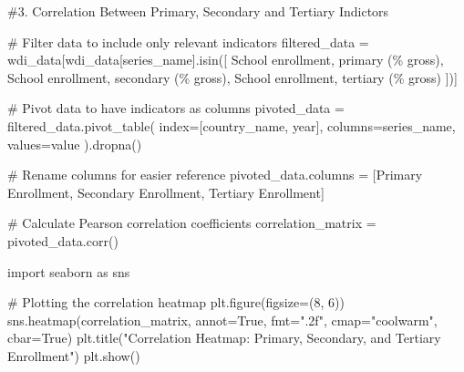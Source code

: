 \documentclass[
  letterpaper,
  DIV=11,
  numbers=noendperiod]{scrartcl}
\newenvironment{Shaded}{\begin{snugshade}}{\end{snugshade}}
\newcommand{\CommentTok}[1]{\textcolor[rgb]{0.37,0.37,0.37}{#1}}
\newcommand{\DecValTok}[1]{\textcolor[rgb]{0.68,0.00,0.00}{#1}}
\newcommand{\ImportTok}[1]{\textcolor[rgb]{0.00,0.46,0.62}{#1}}
\newcommand{\NormalTok}[1]{\textcolor[rgb]{0.00,0.23,0.31}{#1}}
\newcommand{\OperatorTok}[1]{\textcolor[rgb]{0.37,0.37,0.37}{#1}}
\newcommand{\SpecialCharTok}[1]{\textcolor[rgb]{0.37,0.37,0.37}{#1}}
\newcommand{\StringTok}[1]{\textcolor[rgb]{0.13,0.47,0.30}{#1}}
\newcommand{\VariableTok}[1]{\textcolor[rgb]{0.07,0.07,0.07}{#1}}
\begin{document}
\begin{Shaded}
\begin{Highlighting}[]
\CommentTok{\#3. Correlation Between Primary, Secondary and Tertiary Indictors}

\CommentTok{\# Filter data to include only relevant indicators}
\NormalTok{filtered\_data }\OperatorTok{=}\NormalTok{ wdi\_data[wdi\_data[}\StringTok{\textquotesingle{}series\_name\textquotesingle{}}\NormalTok{].isin([}
    \StringTok{\textquotesingle{}School enrollment, primary (}\SpecialCharTok{\% g}\StringTok{ross)\textquotesingle{}}\NormalTok{,}
    \StringTok{\textquotesingle{}School enrollment, secondary (}\SpecialCharTok{\% g}\StringTok{ross)\textquotesingle{}}\NormalTok{,}
    \StringTok{\textquotesingle{}School enrollment, tertiary (}\SpecialCharTok{\% g}\StringTok{ross)\textquotesingle{}}
\NormalTok{])]}

\CommentTok{\# Pivot data to have indicators as columns}
\NormalTok{pivoted\_data }\OperatorTok{=}\NormalTok{ filtered\_data.pivot\_table(}
\NormalTok{    index}\OperatorTok{=}\NormalTok{[}\StringTok{\textquotesingle{}country\_name\textquotesingle{}}\NormalTok{, }\StringTok{\textquotesingle{}year\textquotesingle{}}\NormalTok{], }
\NormalTok{    columns}\OperatorTok{=}\StringTok{\textquotesingle{}series\_name\textquotesingle{}}\NormalTok{, }
\NormalTok{    values}\OperatorTok{=}\StringTok{\textquotesingle{}value\textquotesingle{}}
\NormalTok{).dropna()}

\CommentTok{\# Rename columns for easier reference}
\NormalTok{pivoted\_data.columns }\OperatorTok{=}\NormalTok{ [}\StringTok{\textquotesingle{}Primary Enrollment\textquotesingle{}}\NormalTok{, }\StringTok{\textquotesingle{}Secondary Enrollment\textquotesingle{}}\NormalTok{, }\StringTok{\textquotesingle{}Tertiary Enrollment\textquotesingle{}}\NormalTok{]}

\CommentTok{\# Calculate Pearson correlation coefficients}
\NormalTok{correlation\_matrix }\OperatorTok{=}\NormalTok{ pivoted\_data.corr()}

\ImportTok{import}\NormalTok{ seaborn }\ImportTok{as}\NormalTok{ sns}

\CommentTok{\# Plotting the correlation heatmap}
\NormalTok{plt.figure(figsize}\OperatorTok{=}\NormalTok{(}\DecValTok{8}\NormalTok{, }\DecValTok{6}\NormalTok{))}
\NormalTok{sns.heatmap(correlation\_matrix, annot}\OperatorTok{=}\VariableTok{True}\NormalTok{, fmt}\OperatorTok{=}\StringTok{".2f"}\NormalTok{, cmap}\OperatorTok{=}\StringTok{"coolwarm"}\NormalTok{, cbar}\OperatorTok{=}\VariableTok{True}\NormalTok{)}
\NormalTok{plt.title(}\StringTok{"Correlation Heatmap: Primary, Secondary, and Tertiary Enrollment"}\NormalTok{)}
\NormalTok{plt.show()}
\end{Highlighting}
\end{Shaded}
\end{document}
